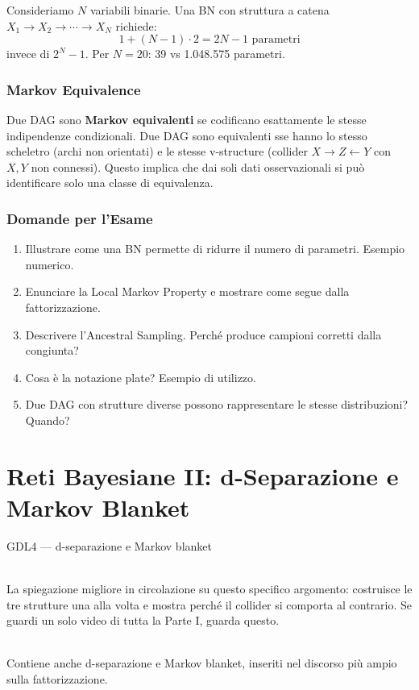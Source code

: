 \begin{tcolorbox}[title=Analisi del risparmio]
Consideriamo $N$ variabili binarie. Una BN con struttura a catena $X_1 \to X_2 \to \cdots \to X_N$ richiede:
\[1 + (N-1) \cdot 2 = 2N - 1 \text{ parametri}\]
invece di $2^N - 1$. Per $N=20$: 39 vs 1.048.575 parametri.
\end{tcolorbox}

\subsection{Markov Equivalence}
Due DAG sono \textbf{Markov equivalenti} se codificano esattamente le stesse indipendenze condizionali. Due DAG sono equivalenti sse hanno lo stesso scheletro (archi non orientati) e le stesse v-structure (collider $X \to Z \leftarrow Y$ con $X,Y$ non connessi). Questo implica che dai soli dati osservazionali si può identificare solo una classe di equivalenza.

\subsection{Domande per l'Esame}
\begin{enumerate}
    \item Illustrare come una BN permette di ridurre il numero di parametri. Esempio numerico.
    \item Enunciare la Local Markov Property e mostrare come segue dalla fattorizzazione.
    \item Descrivere l'Ancestral Sampling. Perché produce campioni corretti dalla congiunta?
    \item Cosa è la notazione plate? Esempio di utilizzo.
    \item Due DAG con strutture diverse possono rappresentare le stesse distribuzioni? Quando?
\end{enumerate}

\chapter{Reti Bayesiane II: d-Separazione e Markov Blanket}

\begin{risorsevideo}{GDL4 — d-separazione e Markov blanket}

\medskip
{}\\
La spiegazione migliore in circolazione su questo specifico argomento: costruisce le tre strutture una alla volta e mostra perché il collider si comporta al contrario. Se guardi un solo video di tutta la Parte I, guarda questo.

\medskip
{}\\
Contiene anche d-separazione e Markov blanket, inseriti nel discorso più ampio sulla fattorizzazione.
\end{risorsevideo}

